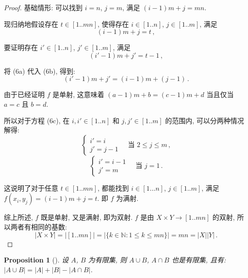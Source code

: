 \documentclass[UTF8]{ctexart}
\theoremstyle{mystyle}
\newtheorem{proposition}{Proposition}[section]
\theoremstyle{myremark}
\theoremstyle{plain}
\newcommand{\N}{\mathbb N}
\newcommand{\set}[1]{\{#1\}}
\begin{document}
\begin{proof}
    基础情形: 可以找到 $ i = n $, $ j = m $, 满足 $ (i - 1) m + j = m n $.

    现归纳地假设存在 $ t \in [1 .. mn] $, 使得存在 $ i \in [1 .. n] $, $ j \in [1 .. m] $, 满足 \[ (i - 1) m + j = t \tag{6a} \,,\] 
    
    要证明存在 $ i' \in [1 .. n] $, $ j' \in [1 .. m] $, 满足 \[ (i' - 1) m + j' = t - 1 \tag{6b} \,,\]

    将 (6a) 代入 (6b), 得到:
    \[ (i' - 1) m + j' = (i - 1) m + (j - 1) \tag{6c} \,.\]

    由于已经证明 $ f $ 是单射, 这意味着 $ (a - 1) m + b = (c - 1) m + d $ 当且仅当 $ a = c $ 且 $ b = d $. 
    
    所以对于方程 (6c), 在 $ i, i' \in [1 .. n] $ 和 $ j, j' \in [1 .. m] $ 的范围内, 可以分两种情况解得:
    \[ \begin{cases}
        i' = i \\
        j' = j - 1
    \end{cases} \quad \text{当 } 2 \leqslant j \leqslant m \,,\]
    \[ \begin{cases}
        i' = i - 1 \\
        j' = m
    \end{cases} \quad \text{当 } j = 1 \,.\]

    这说明了对于任意 $ t \in [1 .. m n] $, 都能找到 $ i \in [1 ... n] $, $ j \in [1 .. m] $, 满足 $ f(x_i, y_j) = (i - 1) m + j = t $. 即 $ f $ 为满射.

    综上所述, $ f $ 既是单射, 又是满射, 即为双射. $ f $ 是由 $ X \times Y \to [1 .. mn] $ 的双射, 所以两者有相同的基数:
    \[ |X \times Y| = |[1 .. mn]| = |\set{k \in \N \colon 1 \leqslant k \leqslant mn}| = m n = |X| |Y| \,.\]
\end{proof}


\begin{proposition}[]
    设 $ A $, $ B $ 为有限集, 则 $ A \cup B $, $ A \cap B $ 也是有限集, 且有: $ |A \cup B| = |A| + |B| - |A \cap B| $.
\end{proposition}
\end{document}

